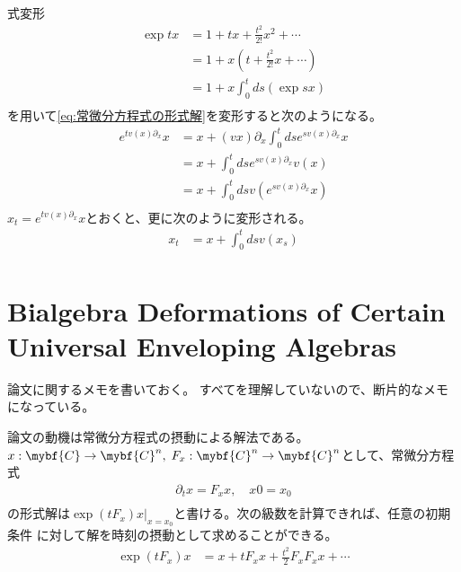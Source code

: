 	\begin{formula}[Picardの再帰法]\label{formula:Picardの再帰法} %
		式変形
		\begin{equation}\begin{split} %
			\exp tx &= 1 + tx + \frac{t^2}{2!}x^2 + \cdots \\
				&= 1 + x(t + \frac{t^2}{2!}x + \cdots) \\
				&= 1 + x\int_0^t ds (\exp sx) \\
		\end{split}\end{equation} %
		を用いて\eqref{eq:常微分方程式の形式解}を変形すると次のようになる。
		\begin{equation}\begin{split} %
			e^{tv(x)\partial_x}x
			&= x + (vx)\partial_x\int_{0}^t dse^{sv(x)\partial_x}x \\
			&= x + \int_{0}^t dse^{sv(x)\partial_x}v(x) \\
			&= x + \int_{0}^t dsv(e^{sv(x)\partial_x}x) \\
		\end{split}\end{equation} %
		$x_t=e^{tv(x)\partial_x}x$とおくと、更に次のように変形される。
		\begin{equation}\begin{split} %
			x_t &= x + \int_0^t dsv(x_s) \\
		\end{split}\end{equation} %
	\end{formula} %

\section{Bialgebra Deformations of Certain Universal Enveloping Algebras}\label{s1:Bialgebra Deformations of Certain Universal Enveloping Algebras} %
	論文\cite{url:grossman:deform}に関するメモを書いておく。
	すべてを理解していないので、断片的なメモになっている。

	論文\cite{url:grossman:deform}の動機は常微分方程式の摂動による解法である。
	$x:\mybf{C}\to \mybf{C}^n,\;F_x:\mybf{C}^n\to \mybf{C}^n$として、常微分方程式
	\begin{equation}\begin{split} %
		\partial_tx = F_xx,\quad x0 = x_0 \\
	\end{split}\end{equation} %
	の形式解は$\exp(tF_x)x|_{x=x_0}$と書ける。次の級数を計算できれば、任意の初期条件
	に対して解を時刻の摂動として求めることができる。
	\begin{equation}\begin{split} %
		\exp(tF_x)x &= x + tF_xx + \frac{t^2}{2}F_xF_xx + \cdots \\
	\end{split}\end{equation} %


